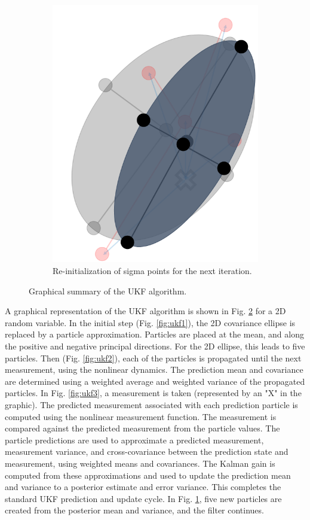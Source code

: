 \begin{figure}[h!]
\begin{subfigure}[b]{0.35\textwidth}
	\includegraphics[width=\linewidth]{./ukf4}
	\caption{Re-initialization of sigma points for the next iteration.}
	\label{fig:ukf4}
	\end{subfigure}
	\caption{Graphical summary of the UKF algorithm.}
	\label{fig:ukf_summary}
\end{figure}

A graphical representation of the UKF algorithm is shown in Fig. \ref{fig:ukf_summary} for a 2D random variable.
In the initial step (Fig. \ref{fig:ukf1}), the 2D covariance ellipse is replaced by a particle approximation.
Particles are placed at the mean, and along the positive and negative principal directions.
For the 2D ellipse, this leads to five particles.
Then (Fig. \ref{fig:ukf2}), each of the particles is propagated until the next measurement, using the nonlinear dynamics.
The prediction mean and covariance are determined using a weighted average and weighted variance of the propagated particles.
In Fig. \ref{fig:ukf3}, a measurement is taken (represented by an "X" in the graphic).
The predicted measurement associated with each prediction particle is computed using the nonlinear measurement function.
The measurement is compared against the predicted measurement from the particle values.
The particle predictions are used to approximate a predicted measurement, measurement variance, and cross-covariance between the prediction state and measurement, using weighted means and covariances.
The Kalman gain is computed from these approximations and used to update the prediction mean and variance to a posterior estimate and error variance.
This completes the standard UKF prediction and update cycle.
In Fig. \ref{fig:ukf4}, five new particles are created from the posterior mean and variance, and the filter continues.

